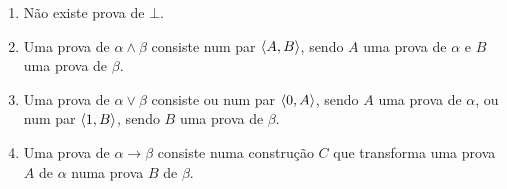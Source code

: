     \begin{enumerate}[label=\textbf{(\alph*)}, left=\parindent]
        \item Não existe prova de $\bot$.
        \item Uma prova de $\alpha\wedge\beta$ consiste num par $\langle A,B\rangle$, sendo $A$ uma prova de $\alpha$ e $B$ uma prova de $\beta$.
        \item Uma prova de $\alpha\vee\beta$ consiste ou num par $\langle0,A\rangle$, sendo $A$ uma prova de $\alpha$, ou num par $\langle1,B\rangle$, sendo $B$ uma prova de $\beta$.
        \item Uma prova de $\alpha\to\beta$ consiste numa construção $C$ que transforma uma prova $A$ de $\alpha$ numa prova $B$ de $\beta$.
    \end{enumerate}

